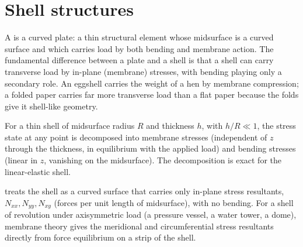 \section{Shell structures}

A  is a curved plate: a thin structural element whose
midsurface is a curved surface and which carries load by both
bending and membrane action. The fundamental difference between a
plate and a shell is that a shell can carry transverse load by
in-plane (membrane) stresses, with bending playing only a secondary
role. An eggshell carries the weight of a hen by membrane
compression; a folded paper carries far more transverse load than a
flat paper because the folds give it shell-like geometry.

For a thin shell of midsurface radius $R$ and thickness $h$, with
$h/R \ll 1$, the stress state at any point is decomposed into
membrane stresses (independent of $z$ through the thickness, in
equilibrium with the applied load) and bending stresses (linear in
$z$, vanishing on the midsurface). The decomposition is exact for
the linear-elastic shell.

 treats the shell as a curved surface that
carries only in-plane stress resultants, $N_{xx}, N_{yy}, N_{xy}$
(forces per unit length of midsurface), with no bending. For a
shell of revolution under axisymmetric load (a pressure vessel, a
water tower, a dome), membrane theory gives the meridional and
circumferential stress resultants directly from force equilibrium
on a strip of the shell.

